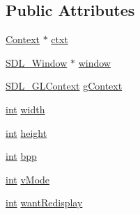\subsection*{Public Attributes}
\begin{DoxyCompactItemize}
\item 
\hyperlink{class_context}{Context} $\ast$ \hyperlink{class_s_d_l_app_aa618d890856ef32dd9eb5aaafef71082}{ctxt}
\item 
\hyperlink{_s_d_l__video_8h_a55a196c7d3b8497538632c79ae1e6392}{S\-D\-L\-\_\-\-Window} $\ast$ \hyperlink{class_s_d_l_app_a3e580384a6e338d91c5f6b474324ac72}{window}
\item 
\hyperlink{_s_d_l__video_8h_a0d64dcf67c9685d09cbe051448e1b3f3}{S\-D\-L\-\_\-\-G\-L\-Context} \hyperlink{class_s_d_l_app_a81b19177c28e37315c8a6e6b6283fc00}{g\-Context}
\item 
\hyperlink{_s_d_l__thread_8h_a6a64f9be4433e4de6e2f2f548cf3c08e}{int} \hyperlink{class_s_d_l_app_a7312e946df07c8cc67d60f3b526eb7e3}{width}
\item 
\hyperlink{_s_d_l__thread_8h_a6a64f9be4433e4de6e2f2f548cf3c08e}{int} \hyperlink{class_s_d_l_app_a075d4e09e70ba64c8ec206580e26402c}{height}
\item 
\hyperlink{_s_d_l__thread_8h_a6a64f9be4433e4de6e2f2f548cf3c08e}{int} \hyperlink{class_s_d_l_app_afcefe0414e22f19e20de7df6f4b75d93}{bpp}
\item 
\hyperlink{_s_d_l__thread_8h_a6a64f9be4433e4de6e2f2f548cf3c08e}{int} \hyperlink{class_s_d_l_app_a66b859368f2d1c4fb00e630b02a588e9}{v\-Mode}
\item 
\hyperlink{_s_d_l__thread_8h_a6a64f9be4433e4de6e2f2f548cf3c08e}{int} \hyperlink{class_s_d_l_app_af08c1e44220e049fd418d83fcefcb65a}{want\-Redisplay}
\end{DoxyCompactItemize}


